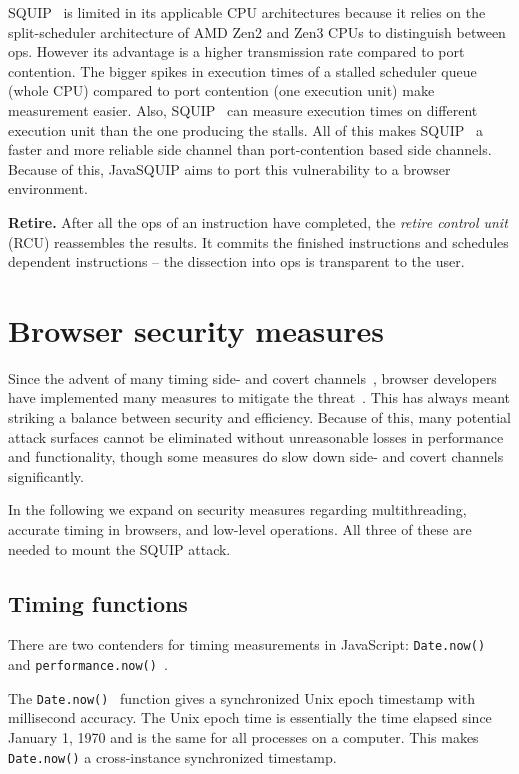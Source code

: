 \documentclass[11pt,
  titlepage=false,
]{scrreprt}
\begin{document}
SQUIP~\cite{squip} is limited in its applicable CPU architectures because it relies on the split-scheduler architecture of AMD Zen2 and Zen3 CPUs to distinguish between \textmu ops.
However its advantage is a higher transmission rate compared to port contention.
The bigger spikes in execution times of a stalled scheduler queue (whole CPU) compared to port contention (one execution unit) make measurement easier.
Also, SQUIP~\cite{squip} can measure execution times on different execution unit than the one producing the stalls.
All of this makes SQUIP~\cite{squip} a faster and more reliable side channel than port-contention based side channels.
Because of this, JavaSQUIP aims to port this vulnerability to a browser environment.


\textbf{Retire.}
After all the \textmu ops of an instruction have completed, the \textit{retire control unit} (RCU) reassembles the results.
It commits the finished instructions and schedules dependent instructions -- the dissection into \textmu ops is transparent to the user.


\section{Browser security measures}
\label{sec:browsersecurity}
Since the advent of many timing side- and covert channels~\cite{noack2018exploiting, Rokicki2022webport, gruss2016rowhammer},
browser developers have implemented many measures to mitigate the threat~\cite{shusterman2021prime, performancenow, performancenowchrome}.
This has always meant striking a balance between security and efficiency.
Because of this, many potential attack surfaces cannot be eliminated without unreasonable losses in performance and functionality,
though some measures do slow down side- and covert channels significantly.

In the following we expand on security measures regarding multithreading, accurate timing in browsers, and low-level operations.
All three of these are needed to mount the SQUIP attack.


\subsection{Timing functions}\label{subsec:timingjs}
There are two contenders for timing measurements in JavaScript: \texttt{Date.now()}~\cite{datenow} and \texttt{performance.now()}~\cite{performancenow}.

The \texttt{Date.now()}~\cite{datenow} function gives a synchronized Unix epoch timestamp with millisecond accuracy.
The Unix epoch time is essentially the time elapsed since January 1, 1970 and is the same for all processes on a computer.
This makes \texttt{Date.now()} a cross-instance synchronized timestamp.
\end{document}
